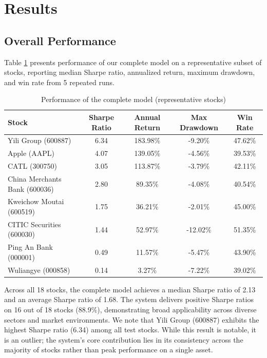 \documentclass[review]{elsarticle}
\begin{document}
\section{Results}

\subsection{Overall Performance}

Table \ref{tab:overall} presents performance of our complete model on a representative subset of stocks, reporting median Sharpe ratio, annualized return, maximum drawdown, and win rate from 5 repeated runs.

\begin{table}[t]
\centering
\caption{Performance of the complete model (representative stocks)}
\label{tab:overall}
\small
\begin{tabular}{lcccc}
\toprule
Stock & Sharpe Ratio & Annual Return & Max Drawdown & Win Rate \\
\midrule
Yili Group (600887) & 6.34 & 183.98\% & -9.20\% & 47.62\% \\
Apple (AAPL) & 4.07 & 139.05\% & -4.56\% & 39.53\% \\
CATL (300750) & 3.05 & 113.87\% & -3.79\% & 42.11\% \\
China Merchants Bank (600036) & 2.80 & 89.35\% & -4.08\% & 40.54\% \\
Kweichow Moutai (600519) & 1.75 & 36.21\% & -2.01\% & 45.00\% \\
CITIC Securities (600030) & 1.44 & 52.97\% & -12.02\% & 51.35\% \\
Ping An Bank (000001) & 0.49 & 11.57\% & -5.47\% & 43.90\% \\
Wuliangye (000858) & 0.14 & 3.27\% & -7.22\% & 39.02\% \\
\bottomrule
\end{tabular}
\end{table}

Across all 18 stocks, the complete model achieves a median Sharpe ratio of 2.13 and an average Sharpe ratio of 1.68. The system delivers positive Sharpe ratios on 16 out of 18 stocks (88.9\%), demonstrating broad applicability across diverse sectors and market environments. We note that Yili Group (600887) exhibits the highest Sharpe ratio (6.34) among all test stocks. While this result is notable, it is an outlier; the system's core contribution lies in its consistency across the majority of stocks rather than peak performance on a single asset.
\end{document}
